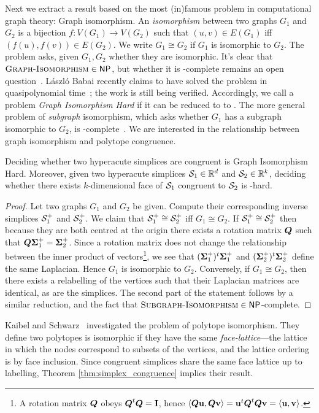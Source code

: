 Next we extract a result based on the most (in)famous problem in computational graph theory: Graph isomorphism. An \emph{isomorphism} between two graphs $G_1$ and $G_2$ is a bijection $f:V(G_1)\to V(G_2)$ such that $(u,v)\in E(G_1)$ iff $(f(u),f(v))\in E(G_2)$. We write $G_1\cong G_2$ if $G_1$ is isomorphic to $G_2$. The \graphiso problem asks, given $G_1,G_2$ whether they are isomorphic. 
It's clear that $\textsc{Graph-Isomorphism}\in{\normalfont\textsf{NP}}$, but whether it is \NP-complete remains an open question~\cite{mckay2014practical}. L{\'a}szl{\'o} Babai recently claims to have solved the problem in  quasipolynomial time~\cite{babai2016graph}; the work is still being verified. 
Accordingly, we call a problem \emph{Graph Isomorphism Hard} if it can be reduced to to \graphiso. 
The more general problem of \emph{subgraph} isomorphism, which asks whether $G_1$ has a subgraph isomorphic to $G_2$, is \NP-complete~\cite{cook1971complexity, karp1972reducibility}. We are interested in the relationship between graph isomorphism and polytope congruence.  

\begin{theorem}
	\label{thm:simplex_congruence}
Deciding whether two hyperacute simplices are congruent is Graph Isomorphism Hard. Moreover, given two hyperacute simplices $\mathcal{S}_1\in\mathbb{R}^d$ and $\mathcal{S}_2\in\mathbb{R}^k$, deciding whether there exists $k$-dimensional face of $\mathcal{S}_1$ congruent to $\mathcal{S}_2$ is \NP-hard. 
\end{theorem}
\begin{proof}
	Let two graphs $G_1$ and $G_2$ be given. Compute their corresponding inverse simplices $\mathcal{S}_1^+$ and $\mathcal{S}_2^+$. 
	We claim that $\mathcal{S}_1^+\cong\mathcal{S}_2^+$ iff $G_1\cong G_2$. If $\mathcal{S}_1^+\cong\mathcal{S}_2^+$ then because they are both centred at the origin there exists a rotation matrix $\vb*{Q}$ such that $\vb*{Q}\boldsymbol{\Sigma}_1^+=\boldsymbol{\Sigma}_2^+$. Since a rotation matrix does not change the relationship between the inner product of vectors\footnote{A rotation matrix $\vb*{Q}$ obeys $\vb*{Q}^t\vb*{Q}=\vb{I}$, hence $\langle \vb*{Q}\vb{u},\vb*{Q}\vb{v}\rangle = \vb{u}^t \vb*{Q}^t \vb*{Q}\vb{v}=\langle \vb{u},\vb{v}\rangle$.}, we see that $(\boldsymbol{\Sigma}_1^+)^t\boldsymbol{\Sigma}_1^+$ and $(\boldsymbol{\Sigma}_2^+)^t\boldsymbol{\Sigma}_2^+$ define the same Laplacian. Hence $G_1$ is isomorphic to $G_2$. Conversely, if $G_1\cong G_2$, then there exists a  relabelling of the vertices such that their Laplacian matrices are identical, as are the simplices. The second part of the statement follows by a similar reduction, and the fact that $\textsc{Subgraph-Isomorphism}\in{\normalfont\textsf{NP}}$-complete.
\end{proof}

Kaibel and Schwarz~\cite{kaibel2008complexity} investigated the problem of polytope isomorphism. They define two polytopes is isomorphic if they have the same \emph{face-lattice}---the lattice in which the nodes correspond to subsets of the vertices, and the lattice ordering is by face inclusion. Since congruent simplices share the same face  lattice up to labelling, Theorem \ref{thm:simplex_congruence} implies their result. 


